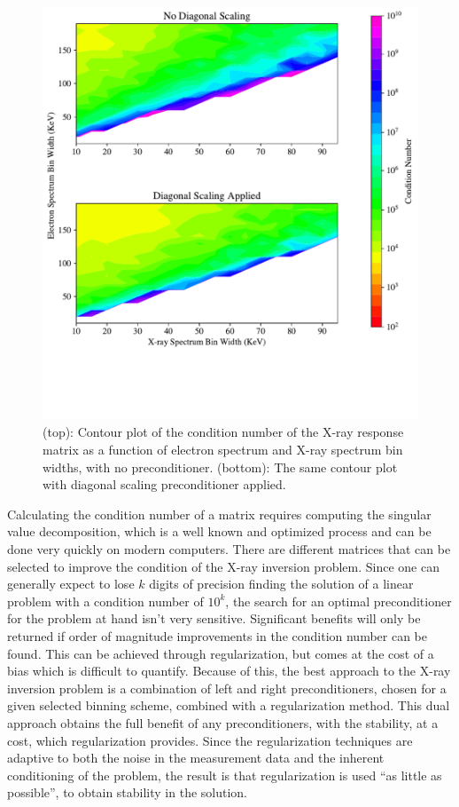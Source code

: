 \begin{figure}[p]
    \centering
    \includegraphics[width=\textwidth]{figures/chapter_4/condition_number_binning_diagonal_scaling/condition_number_binning_diagonal_scaling.pdf}
    \caption{(top): Contour plot of the condition number of the X-ray response matrix as a function of electron spectrum and X-ray spectrum bin widths, with no preconditioner. (bottom): The same contour plot with diagonal scaling preconditioner applied.}
    \label{matrix_spectral_plot_diagonal_scaling}
\end{figure}

Calculating the condition number of a matrix requires computing the singular value decomposition, which is a well known and optimized process and can be done very quickly on modern computers. There are different matrices that can be selected to improve the condition of the X-ray inversion problem. Since one can generally expect to lose $k$ digits of precision finding the solution of a linear problem with a condition number of $10^k$, the search for an optimal preconditioner for the problem at hand isn't very sensitive. Significant benefits will only be returned if order of magnitude improvements in the condition number can be found. This can be achieved through regularization, but comes at the cost of a bias which is difficult to quantify. Because of this, the best approach to the X-ray inversion problem is a combination of left and right preconditioners, chosen for a given selected binning scheme, combined with a regularization method. This dual approach obtains the full benefit of any preconditioners, with the stability, at a cost, which regularization provides. Since the regularization techniques are adaptive to both the noise in the measurement data and the inherent conditioning of the problem, the result is that regularization is used ``as little as possible'', to obtain stability in the solution. 

